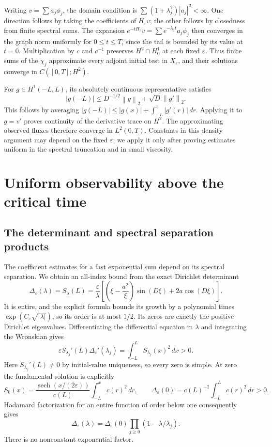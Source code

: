 \documentclass[11pt]{article}
\numberwithin{equation}{section}
\newcommand{\eps}{\varepsilon}
\newcommand{\sech}{\operatorname{sech}}
\newcommand{\norm}[1]{\left\|#1\right\|}
\begin{document}
Writing $v=\sum a_j\phi_j$, the domain condition is
$\sum(1+\lambda_j^2)|a_j|^2<\infty$.
One direction follows by taking the coefficients of $H_\eps v$;
the other follows by closedness from finite spectral sums.
The expansion $e^{-tH_\eps}v=\sum e^{-\lambda_jt}a_j\phi_j$ then
converges in the graph norm uniformly for $0\le t\le T$, since the
tail is bounded by its value at $t=0$.
Multiplication by $c$ and $c^{-1}$ preserves $H^2\cap H_0^1$ at each
fixed $\eps$. Thus finite sums of the $\chi_j$ approximate every
adjoint initial test in $X_\eps$, and their solutions converge in
$C([0,T];H^2)$.

For $g\in H^1(-L,L)$, its absolutely continuous representative satisfies
\[
 |g(-L)|\le D^{-1/2}\norm g_2+\sqrt D\norm{g'}_2.
\]
This follows by averaging
$|g(-L)|\le|g(x)|+\int_{-L}^x|g'(r)|\,dr$.
Applying it to $g=v'$ proves continuity of the derivative trace on
$H^2$. The approximating observed fluxes therefore converge in
$L^2(0,T)$.
Constants in this density argument may depend on the fixed $\eps$;
we apply it only after proving estimates uniform in the spectral
truncation and in small viscosity.

\section{Uniform observability above the critical time}\label{sec:upper}

\subsection{The determinant and spectral separation products}

The coefficient estimates for a fast exponential sum depend on its
spectral separation. We obtain an all-index bound from the exact
Dirichlet determinant
\begin{equation}\label{eq:Delta}
 \Delta_\eps(\lambda)=S_\lambda(L)
 =\frac\eps\lambda
  \left[\left(\xi-\frac{a^2}{\xi}\right)\sin(D\xi)
                  +2a\cos(D\xi)\right].
\end{equation}
It is entire, and the explicit formula bounds its growth by a polynomial
times $\exp(C_\eps\sqrt{|\lambda|})$, so its order is at most $1/2$.
Its zeros are exactly the positive Dirichlet eigenvalues.
Differentiating the differential equation in $\lambda$ and integrating
the Wronskian gives
\[
 \eps S_{\lambda_j}'(L)\Delta_\eps'(\lambda_j)
       =\int_{-L}^L S_{\lambda_j}(x)^2\,dx>0.
\]
Here $S_{\lambda_j}'(L)\ne0$ by initial-value uniqueness, so every zero
is simple. At zero the fundamental solution is explicitly
\[
 S_0(x)=\frac{\sech(x/(2\eps))}{c(L)}
                      \int_{-L}^x c(r)^2\,dr,\qquad
 \Delta_\eps(0)=c(L)^{-2}\int_{-L}^L c(r)^2\,dr>0.
\]
Hadamard factorization for an entire function of order below one
\cite[Section 6.4.3]{Weikard} consequently gives
\begin{equation}\label{eq:Hadamard}
 \Delta_\eps(\lambda)=\Delta_\eps(0)
                     \prod_{j\ge0}(1-\lambda/\lambda_j).
\end{equation}
There is no nonconstant exponential factor.
\end{document}
